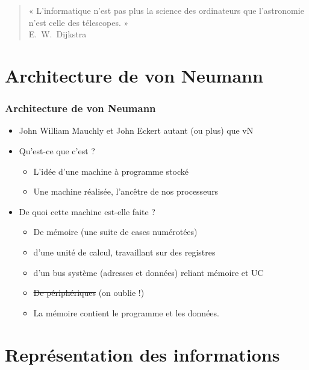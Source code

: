 \documentclass[xcolor=svgnames]{beamer}
\begin{document}
\begin{frame}
  \begin{quote}
  « L'informatique n'est pas plus la science des ordinateurs que
  l'astronomie n'est celle des télescopes. »\\ 
  \hfill E.~W.~Dijkstra\\[1cm]
\end{quote}
\end{frame}

\section{Architecture de von Neumann}
\begin{frame}
  \frametitle{Architecture de von Neumann}
  \begin{itemize}
  \item John William Mauchly et John Eckert autant (ou plus) que
    vN\pause
  \item Qu'est-ce que c'est ?\pause
    \begin{itemize}      
  \item L'idée d'une machine à \alert{programme
      stocké}\pause
\item  Une machine réalisée, l'ancêtre de nos processeurs\pause
\end{itemize}
  \item De quoi  cette machine est-elle faite ?\pause
    \begin{itemize}
    \item De mémoire (une suite de cases numérotées)\pause
    \item d'une \alert{unité de calcul}, travaillant sur des \alert{registres}\pause
    \item d'un \alert{bus} système (adresses et données) reliant mémoire
      et UC\pause
    \item \sout{De périphériques} (on oublie !)\pause
    \item La mémoire contient le programme et les données.
    \end{itemize}
  \end{itemize}
\end{frame}


\section{Représentation  des informations}
\end{document}

